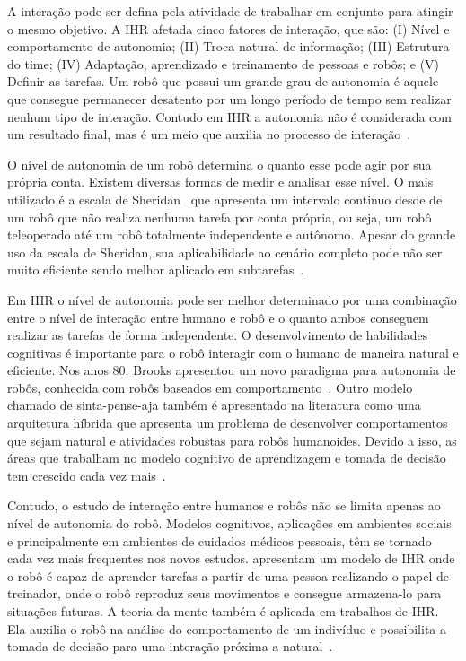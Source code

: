 A interação pode ser defina pela atividade de trabalhar em conjunto para atingir o mesmo objetivo. A IHR afetada cinco fatores de interação, que são: (I) Nível e comportamento de autonomia; (II) Troca natural de informação; (III) Estrutura do time; (IV) Adaptação, aprendizado e treinamento de pessoas e robôs; e (V) Definir as tarefas. Um robô que possui um grande grau de autonomia é aquele que consegue permanecer desatento por um longo período de tempo sem realizar nenhum tipo de interação. Contudo em IHR a autonomia não é considerada com um resultado final, mas é um meio que auxilia no processo de interação~\cite{Goodrich:2007, Weiss:2010}.

O nível de autonomia de um robô determina o quanto esse pode agir por sua própria conta. Existem diversas formas de medir e analisar esse nível. O mais utilizado é a escala de Sheridan~\cite{Sheridan:1978} que apresenta um intervalo continuo desde de um robô que não realiza nenhuma tarefa por conta própria, ou seja, um robô teleoperado até um robô totalmente independente e autônomo. Apesar do grande uso da escala de Sheridan, sua aplicabilidade ao cenário completo pode não ser muito eficiente sendo melhor aplicado em subtarefas~\cite{Goodrich:2007, Weiss:2010}.

Em IHR o nível de autonomia pode ser melhor determinado por uma combinação entre o nível de interação entre humano e robô e o quanto ambos conseguem realizar as tarefas de forma independente. O desenvolvimento de habilidades cognitivas é importante para o robô interagir com o humano de maneira natural e eficiente. Nos anos 80, Brooks apresentou um novo paradigma para autonomia de robôs, conhecida com robôs baseados em comportamento~\cite{Brooks:1986, Brooks:1991}. Outro modelo chamado de sinta-pense-aja também é apresentado na literatura como uma arquitetura híbrida que apresenta um problema de desenvolver comportamentos que sejam natural e atividades robustas para robôs humanoides. Devido a isso, as áreas que trabalham no modelo cognitivo de aprendizagem e tomada de decisão tem crescido cada vez mais~\cite{Goodrich:2007}. 

Contudo, o estudo de interação entre humanos e robôs não se limita apenas ao nível de autonomia do robô. Modelos cognitivos, aplicações em ambientes sociais e principalmente em ambientes de cuidados médicos pessoais, têm se tornado cada vez mais frequentes nos novos estudos.  apresentam um modelo de IHR onde o robô é capaz de aprender tarefas a partir de uma pessoa realizando o papel de treinador, onde o robô reproduz seus movimentos e consegue armazena-lo para situações futuras. A teoria da mente também é aplicada em trabalhos de IHR. Ela auxilia o robô na análise do comportamento de um indivíduo e possibilita a tomada de decisão para uma interação próxima a natural~\cite{Hiatt:2011}.

